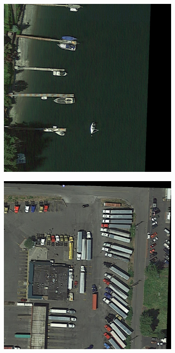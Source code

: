 \documentclass[conference]{IEEEtran}
\begin{document}
	\begin{figure}[h!]
  	\centering
   	\begin{subfigure}[b]{0.4\linewidth}
    	\includegraphics[width=\linewidth]{P0001__1__228___3696.png}
   	\end{subfigure}
  	\begin{subfigure}[b]{0.4\linewidth}
    	\includegraphics[width=\linewidth]{P0007__1__466___0.png}

\end{subfigure}
\end{figure}
\end{document}
